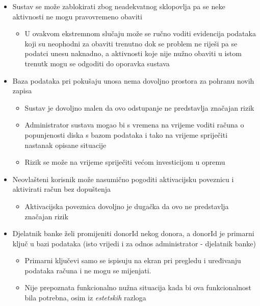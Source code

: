 \begin{itemize}
                \item Sustav se može zablokirati zbog neadekvatnog sklopovlja pa se neke aktivnosti ne mogu pravovremeno obaviti
                \begin{itemize}
                    \item U ovakvom ekstremnom slučaju može se ručno voditi evidencija podataka koji su neophodni za obaviti trenutno dok se problem ne riješi pa se podatci unesu naknadno, a aktivnosti koje nije nužno obaviti u istom trenutk mogu se odgoditi do oporavka sustava
                \end{itemize}
                
                \item Baza podataka pri pokušaju unosa nema dovoljno prostora za pohranu novih zapisa
                \begin{itemize}
                    \item Sustav je dovoljno malen da ovo odstupanje ne predstavlja značajan rizik
                    \item Administrator sustava mogao bi s vremena na vrijeme voditi računa o popunjenosti diska s bazom podataka i tako na vrijeme spriječiti nastanak opisane situacije
                    \item Rizik se može na vrijeme spriječiti većom investicijom u opremu
                \end{itemize}
                
                \item Neovlašteni korisnik može nasumično pogoditi aktivacijsku poveznicu i aktivirati račun bez dopuštenja
                \begin{itemize}
                    \item Aktivacijska poveznica dovoljno je dugačka da ovo ne predstavlja značajan rizik
                \end{itemize} 
                
                \item Djelatnik banke želi promijeniti donorId nekog donora, a donorId je primarni ključ u bazi podataka (isto vrijedi i za odnos administrator - djelatnik banke)
                \begin{itemize}
                    \item Primarni ključevi samo se ispisuju na ekran pri pregledu i uređivanju podataka računa i ne mogu se mijenjati.
                    \item Nije prepoznata funkcionalno nužna situacija kada bi ova funkcionalnost bila potrebna, osim iz \textit{estetskih} razloga 
                \end{itemize}
                

\end{itemize}

